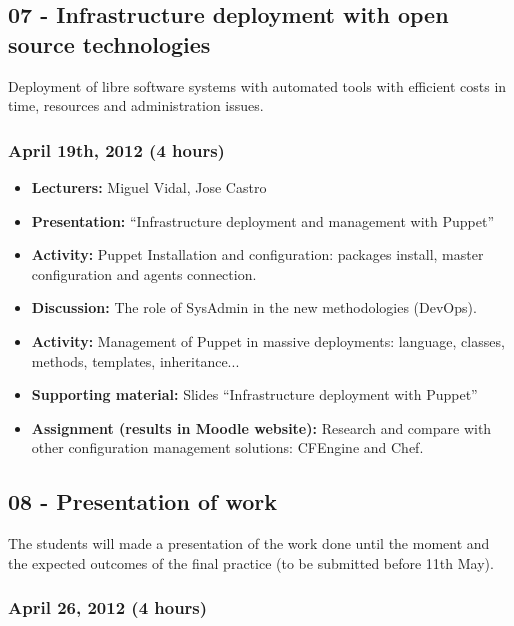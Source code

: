 \documentclass[a4paper]{article}
\begin{document}
\subsection{07 - Infrastructure deployment with open source technologies}

Deployment of libre software systems with automated tools with efficient costs in time, resources and administration issues.

\subsubsection{April 19th, 2012 (4 hours)}


\begin{itemize}
\item \textbf{Lecturers:} Miguel Vidal, Jose Castro
\item \textbf{Presentation:} ``Infrastructure deployment and management with Puppet''
\item \textbf{Activity:} Puppet Installation and configuration: packages install, master configuration and agents connection.
\item \textbf{Discussion:} The role of SysAdmin in the new methodologies (DevOps).
\item \textbf{Activity:} Management of Puppet in massive deployments: language, classes, methods, templates, inheritance...
\item \textbf{Supporting material:} Slides ``Infrastructure deployment with Puppet''
\item \textbf{Assignment (results in Moodle website):} Research and compare with other configuration management solutions: CFEngine and Chef.
\end{itemize}




\subsection{08 - Presentation of work}

The students will made a presentation of the work done until the moment and the expected outcomes of the final practice (to be submitted before 11th May). 

\subsubsection{April 26, 2012 (4 hours)}
\end{document}
